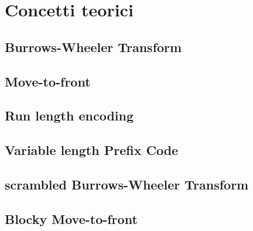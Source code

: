 \chapter{Concetti teorici} %
%
\begin{citazione}
\end{citazione}
\newpage

\section{Burrows-Wheeler Transform} 
\section{Move-to-front} 
\section{Run length encoding} 
\section{Variable length Prefix Code} 
\section{scrambled Burrows-Wheeler Transform} 
\section{Blocky Move-to-front} 
